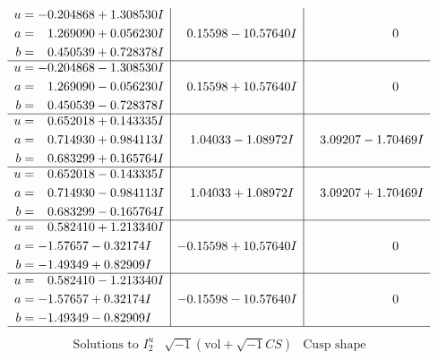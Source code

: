 \documentclass[1p]{elsarticle_modified}
\theoremstyle{definition}
\newcommand{\I}{\sqrt{-1}}
\begin{document}
$$\begin{array}{c|c|c}
\begin{aligned}
u &= -0.204868 + 1.308530 I \\
a &= \phantom{-}1.269090 + 0.056230 I \\
b &= \phantom{-}0.450539 + 0.728378 I\end{aligned}
 & \phantom{-}0.15598 - 10.57640 I & \phantom{-0.000000 } 0 \\ \hline\begin{aligned}
u &= -0.204868 - 1.308530 I \\
a &= \phantom{-}1.269090 - 0.056230 I \\
b &= \phantom{-}0.450539 - 0.728378 I\end{aligned}
 & \phantom{-}0.15598 + 10.57640 I & \phantom{-0.000000 } 0 \\ \hline\begin{aligned}
u &= \phantom{-}0.652018 + 0.143335 I \\
a &= \phantom{-}0.714930 + 0.984113 I \\
b &= \phantom{-}0.683299 + 0.165764 I\end{aligned}
 & \phantom{-}1.04033 - 1.08972 I & \phantom{-}3.09207 - 1.70469 I \\ \hline\begin{aligned}
u &= \phantom{-}0.652018 - 0.143335 I \\
a &= \phantom{-}0.714930 - 0.984113 I \\
b &= \phantom{-}0.683299 - 0.165764 I\end{aligned}
 & \phantom{-}1.04033 + 1.08972 I & \phantom{-}3.09207 + 1.70469 I \\ \hline\begin{aligned}
u &= \phantom{-}0.582410 + 1.213340 I \\
a &= -1.57657 - 0.32174 I \\
b &= -1.49349 + 0.82909 I\end{aligned}
 & -0.15598 + 10.57640 I & \phantom{-0.000000 } 0 \\ \hline\begin{aligned}
u &= \phantom{-}0.582410 - 1.213340 I \\
a &= -1.57657 + 0.32174 I \\
b &= -1.49349 - 0.82909 I\end{aligned}
 & -0.15598 - 10.57640 I & \phantom{-0.000000 } 0\\
 \hline 
 \end{array}$$\newpage$$\begin{array}{c|c|c}  
\text{Solutions to }I^u_{2}& \I (\text{vol} + \sqrt{-1}CS) & \text{Cusp shape}\\

\end{array}$$
\end{document}
